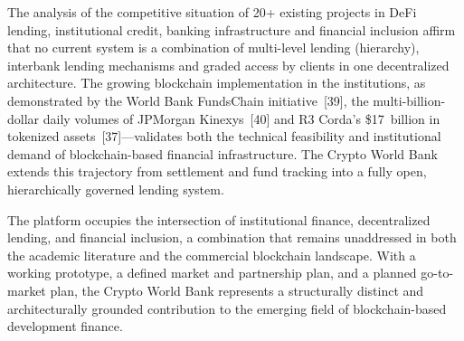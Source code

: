 \documentclass[12pt,a4paper]{report}
\begin{document}
The analysis of the competitive situation of 20+ existing projects in DeFi lending, institutional credit, banking infrastructure and financial inclusion affirm that no current system is a combination of multi-level lending (hierarchy), interbank lending mechanisms and graded access by clients in one decentralized architecture. The growing blockchain implementation in the institutions, as demonstrated by the World Bank FundsChain initiative~[39], the multi-billion-dollar daily volumes of JPMorgan Kinexys~[40] and R3 Corda's \$17~billion in tokenized assets~[37]---validates both the technical feasibility and institutional demand of blockchain-based financial infrastructure. The Crypto World Bank extends this trajectory from settlement and fund tracking into a fully open, hierarchically governed lending system.

The platform occupies the intersection of institutional finance, decentralized lending, and financial inclusion, a combination that remains unaddressed in both the academic literature and the commercial blockchain landscape. With a working prototype, a defined market and partnership plan, and a planned go-to-market plan, the Crypto World Bank represents a structurally distinct and architecturally grounded contribution to the emerging field of blockchain-based development finance.
\end{document}
